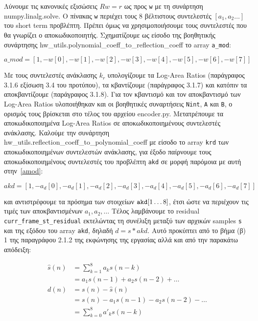 \documentclass{article}
\begin{document}
Λύνουμε τις κανονικές εξισώσεις $Rw=r$ ως προς \verb|w| με τη συνάρτηση 
numpy.linalg.solve. Ο πίνακας \verb|w| περιέχει τους 8 βέλτιστους 
συντελεστές $\left[a_1, a_2 \ldots \right]$ του short term προβλέπτη. Πρέπει όμως να 
χρησιμοποιήσουμε τους συντελεστές που θα γνωρίζει ο αποκωδικοποιητής. Σχηματίζουμε 
ως είσοδο της βοηθητικής συνάρτησης hw\_utils.polynomial\_coeff\_to\_reflection\_coeff
το array \verb|a_mod|:

\begin{equation}
    a\_mod = \left[1, -w[0], -w[1], -w[2], -w[3], -w[4], -w[5], -w[6], -w[7] \right]\label{amod}
\end{equation}

Με τους συντελεστές ανάκλασης $k_r$ υπολογίζουμε τα Log-Area Ratios 
(παράγραφος 3.1.6 εξίσωση 3.4 του προτύπου), τα κβαντίζουμε (παράγραφος 3.1.7) 
και κατόπιν τα αποκβαντίζουμε (παράγραφος 3.1.8). Για τον κβαντισμό και τον 
αποκβαντισμό των Log-Area Ratios υλοποιήθηκαν και οι βοηθητικές συναρτήσεις
\verb|Nint|, \verb|A| και \verb|B|, ο ορισμός τους βρίσκεται στο τέλος του
αρχείου encoder.py\@. Μετατρέπουμε τα αποκωδικοποιημένα Log-Area Ratios
σε αποκωδικοποιημένους συντελεστές ανάκλασης. Καλούμε την συνάρτηση 
hw\_ut\-ils.ref\-lection\_co\-eff\_to\_poly\-nomial\_co\-eff με είσοδο
το array \verb|krd| των αποκωδικοποιημένων συντελεστών ανάκλασης, για έξοδο 
παίρνουμε τους αποκωδικοποιημένους συντελεστές του προβλέπτη \verb|akd| σε μορφή παρόμοια
με αυτή στην~\autoref{amod}:

\begin{equation}
    akd = \left[1, -a_d[0], -a_d[1], -a_d[2], -a_d[3], -a_d[4], -a_d[5], -a_d[6], -a_d[7]\right]
\end{equation}

και αντιστρέφουμε τα πρόσημα των στοιχείων $\verb|akd|[1\ldots8]$, έτσι ώστε
να περιέχουν τις τιμές των αποκβαντι\-σμένων $a_1, a_2, \ldots$ 
Τέλος λαμβάνουμε το residual \verb|curr_frame_st_residual| εκτελώντας τη συνέλιξη 
μεταξύ των αρχικών sam\-ples \verb|s| και της εξόδου του array \verb|akd|, 
δηλαδή $d = s \ast akd$. Αυτό προκύπτει από το βήμα (β) 1 της παραγράφου 
2.1.2 της εκφώνησης της εργασίας αλλά και από την παρακάτω απόδειξη:

\begin{align*}
    \hat{s}(n) &= \sum_{k=1}^8 a_ks(n-k) \\
                   &= a_1 s(n - 1) + a_2 s(n - 2) + \ldots \\
              d(n) &= s(n) - \hat{s}(n) \\
                   &= s(n) - a_1 s(n - 1) - a_2 s(n - 2) - \ldots \\
                   &= \sum_{k=0}^8 a'_ks(n-k)
\end{align*}
\end{document}
